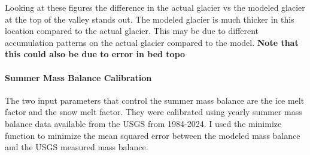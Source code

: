 \documentclass{article}
\begin{document}
Looking at these figures the difference in the actual glacier vs the modeled glacier at the top of the valley stands out. The modeled glacier is much thicker in this 
location compared to the actual glacier. This may be due to different accumulation patterns on the actual glacier compared to the model. 
\textbf{Note that this could also be due to error in bed topo}

\paragraph{Summer Mass Balance Calibration}
The two input parameters that control the summer mass balance are the ice melt factor and the snow melt factor. They were calibrated using yearly summer 
mass balance data available from the USGS from 1984-2024. I used the minimize function 
to minimize the mean squared error between the modeled mass balance and the USGS measured mass balance. 
\end{document}
